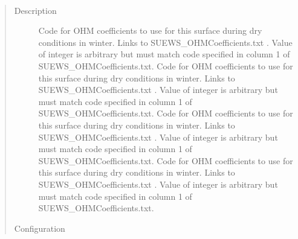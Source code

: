 \documentclass[letterpaper,10pt,english]{sphinxmanual}
\begin{document}

\begin{fulllineitems}
\label{\detokenize{input_files/SUEWS_SiteInfo/Input_Options:cmdoption-arg-ohmcode-winterdry}}~\begin{quote}\begin{description}
\item[{Description}] \leavevmode
Code for OHM coefficients to use for this surface during dry conditions in winter. Links to SUEWS\_OHMCoefficients.txt . Value of integer is arbitrary but must match code specified in column 1 of SUEWS\_OHMCoefficients.txt.  Code for OHM coefficients to use for this surface during dry conditions in winter. Links to SUEWS\_OHMCoefficients.txt . Value of integer is arbitrary but must match code specified in column 1 of SUEWS\_OHMCoefficients.txt.  Code for OHM coefficients to use for this surface during dry conditions in winter. Links to SUEWS\_OHMCoefficients.txt . Value of integer is arbitrary but must match code specified in column 1 of SUEWS\_OHMCoefficients.txt.  Code for OHM coefficients to use for this surface during dry conditions in winter. Links to SUEWS\_OHMCoefficients.txt . Value of integer is arbitrary but must match code specified in column 1 of SUEWS\_OHMCoefficients.txt.

\item[{Configuration}] \leavevmode


\end{description}
\end{quote}
\end{fulllineitems}
\end{document}
